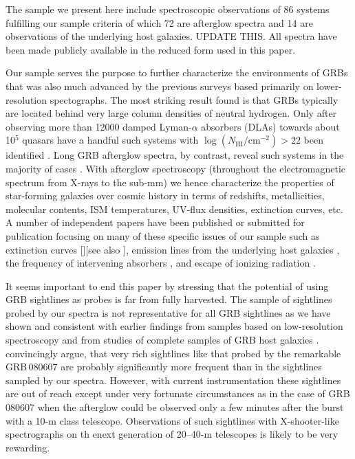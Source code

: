 \documentclass{aa}    %
\begin{document}
The sample we present here include spectroscopic observations of 86 
systems fulfilling our sample criteria of which 72 are afterglow spectra 
and 14 are observations of the underlying host galaxies. 
UPDATE THIS.
All spectra have been made publicly available in the reduced form used
in this paper.

Our sample serves the purpose to further characterize the environments of GRBs
that was also much advanced by the previous surveys based primarily on
lower-resolution spectographs. The most striking result found is that GRBs
typically are located behind very large column densities of neutral hydrogen.
Only after observing more than 12000 damped Lyman-$\alpha$ absorbers (DLAs)
towards about 10$^5$ quasars have a handful such systems with
$\log({N_\mathrm{HI}/\mathrm{cm^{-2}}}) > 22$ been identified \citep[e.g., five
in][]{Noterdaeme2012}. Long GRB afterglow spectra, by contrast, reveal such
systems in the majority of cases \citep[][and this work]{Jakobsson2006,
Fynbo2009,Cucchiara2015}.  With afterglow spectroscopy (throughout the electromagnetic
spectrum from X-rays to the sub-mm) we hence characterize the properties of
star-forming galaxies over cosmic history in terms of redshifts, metallicities,
molecular contents, ISM temperatures, UV-flux densities, extinction curves,
etc.  A number of independent papers have been published or submitted for
publication focusing on many of these specific issues of our sample such as
extinction curves [][see also
\cite{Fynbo2014,Heintz2017}]\citep{Japelj2015,Zafar17}, emission lines from the
underlying host galaxies \citep{Kruhler2015}, the frequency of intervening
 absorbers \citep{Christensen2017}, and escape of ionizing
radiation \citep{Tanvir17}.

It seems important to end this paper by stressing that the potential of 
using GRB sightlines as probes is far from fully harvested. The sample of
sightlines probed by our spectra is not representative for all GRB 
sightlines as we have shown and consistent with earlier findings
from samples based on low-resolution spectroscopy \citep[e.g.,][]{Fynbo2009}
and from studies of complete samples of GRB host galaxies 
\citep{Hjorth2012,Covinto2013,Perley2016}. 
\cite{Kruhler2013} convincingly argue, that 
very rich sightlines like that probed by the remarkable GRB\,080607 
\citep{Prochaska09} are probably significantly more frequent than in the sightlines 
sampled by our spectra. However, with current instrumentation these sightlines are
out of reach except under very fortunate circumstances as in the case of 
GRB\,080607 when the afterglow could be observed only a few minutes after the 
burst with a 10-m class telescope. Observations of such sightlines with 
X-shooter-like spectrographs on th enext generation of 20--40-m telescopes
is likely to be very rewarding. 
\end{document}
